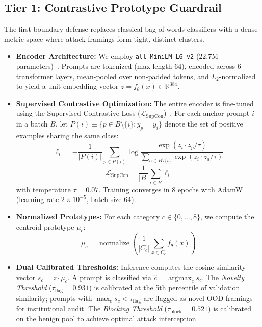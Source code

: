 \documentclass[lettersize,journal]{IEEEtran}
\begin{document}
\subsection{Tier 1: Contrastive Prototype Guardrail}
The first boundary defense replaces classical bag-of-words classifiers with a dense metric space where attack framings form tight, distinct clusters.
\begin{itemize}
    \item \textbf{Encoder Architecture:} We employ \texttt{all-MiniLM-L6-v2} ($22.7\text{M}$ parameters)~\cite{wang2020}. Prompts are tokenized (max length 64), encoded across 6 transformer layers, mean-pooled over non-padded tokens, and $L_2$-normalized to yield a unit embedding vector $z = f_\theta(x) \in \mathbb{R}^{384}$.
    \item \textbf{Supervised Contrastive Optimization:} The entire encoder is fine-tuned using the Supervised Contrastive Loss ($\mathcal{L}_{\mathrm{SupCon}}$)~\cite{khosla2020}. For each anchor prompt $i$ in a batch $B$, let $P(i) \equiv \{p \in B \setminus \{i\} : y_p = y_i\}$ denote the set of positive examples sharing the same class:
    \begin{equation}
    \ell_i = -\frac{1}{|P(i)|}\sum_{p \in P(i)} \log \frac{\exp(z_i \cdot z_p / \tau)}{\sum_{a \in B \setminus \{i\}} \exp(z_i \cdot z_a / \tau)}
    \label{eq:supcon_i}
    \end{equation}
    \begin{equation}
    \mathcal{L}_{\mathrm{SupCon}} = \frac{1}{|B|} \sum_{i \in B} \ell_i
    \label{eq:supcon}
    \end{equation}
    with temperature $\tau = 0.07$. Training converges in 8 epochs with AdamW (learning rate $2\times 10^{-5}$, batch size 64).
    \item \textbf{Normalized Prototypes:} For each category $c \in \{0, \dots, 8\}$, we compute the centroid prototype $\mu_c$:
    \begin{equation}
    \mu_c = \operatorname{normalize}\left(\frac{1}{|C_c|}\sum_{x \in C_c} f_\theta(x)\right)
    \label{eq:proto}
    \end{equation}
    \item \textbf{Dual Calibrated Thresholds:} Inference computes the cosine similarity vector $s_c = z \cdot \mu_c$. A prompt is classified via $\hat{c} = \operatorname{argmax}_c s_c$. The \textit{Novelty Threshold} ($\tau_{\mathrm{flag}} = 0.931$) is calibrated at the 5th percentile of validation similarity; prompts with $\max_c s_c < \tau_{\mathrm{flag}}$ are flagged as novel OOD framings for institutional audit. The \textit{Blocking Threshold} ($\tau_{\mathrm{block}} = 0.521$) is calibrated on the benign pool to achieve optimal attack interception.
\end{itemize}
\end{document}
